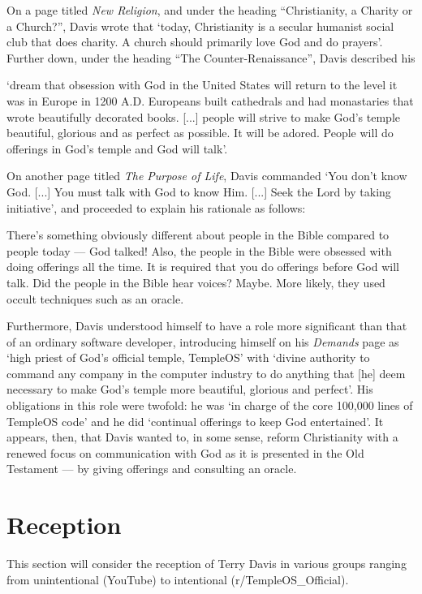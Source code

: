 \documentclass[Draft.tex]{subfiles}
\begin{document}
On a page titled \textit{New Religion}, and under the heading
``Christianity, a Charity or a Church?'', Davis \parencite*{NewReligion}
wrote that `today, Christianity is a secular humanist social club
that does charity.  A church should primarily love God and do prayers'.
Further down, under the heading ``The Counter-Renaissance'',
Davis described his
\begin{displayquote}
	`dream that obsession with God in the United States
	will return to the level it was in Europe in 1200 A.D.
	Europeans built cathedrals and had monastaries
	that wrote beautifully decorated books. [...]
	people will strive to make God's temple beautiful, glorious
	and as perfect as possible.  It will be adored.
	People will do offerings in God's temple and God will talk'.
\end{displayquote}
On another page titled \textit{The Purpose of Life},
Davis \parencite*{PurposeLife} commanded `You don't know God. [...]
You must talk with God to know Him. [...] Seek the Lord by taking initiative',
and proceeded to explain his rationale as follows:
\begin{displayquote}
	There's something obviously different about people in the Bible
	compared to people today --- God talked!
	Also, the people in the Bible were obsessed with doing offerings all the time.
	It is required that you do offerings before God will talk.
	Did the people in the Bible hear voices?  Maybe.
	More likely, they used occult techniques such as an oracle.
\end{displayquote}
Furthermore, Davis \parencite*{Demands} understood himself to have a role
more significant than that of an ordinary software developer,
introducing himself on his \textit{Demands} page as
`high priest of God's official temple, TempleOS' with
`divine authority to command any company in the computer industry
to do anything that [he] deem necessary to make God's temple
more beautiful, glorious and perfect'.
His obligations in this role were twofold: he was
`in charge of the core 100,000 lines of TempleOS code'
and he did `continual offerings to keep God entertained'.
It appears, then, that Davis wanted to, in some sense, reform Christianity
with a renewed focus on communication with God
as it is presented in the Old Testament ---
by giving offerings and consulting an oracle.


\section*{Reception}
This section will consider the reception of Terry Davis in various groups
ranging from unintentional (YouTube) to intentional (r/TempleOS\_Official).
\end{document}
